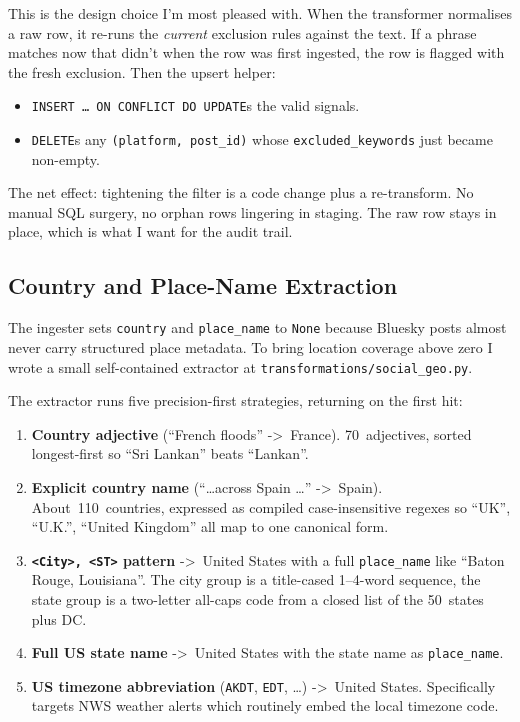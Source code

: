 \documentclass[11pt]{article}
\begin{document}
This is the design choice I'm most pleased with. When the transformer
normalises a raw row, it re-runs the \emph{current} exclusion rules
against the text. If a phrase matches now that didn't when the row was
first ingested, the row is flagged with the fresh exclusion. Then the
upsert helper:

\begin{itemize}[leftmargin=*]
  \item \texttt{INSERT \ldots\ ON CONFLICT DO UPDATE}s the valid signals.
  \item \texttt{DELETE}s any \texttt{(platform, post\_id)} whose
        \texttt{excluded\_keywords} just became non-empty.
\end{itemize}

The net effect: tightening the filter is a code change plus a
re-transform. No manual SQL surgery, no orphan rows lingering in
staging. The raw row stays in place, which is what I want for the
audit trail.

\subsection{Country and Place-Name Extraction}

The ingester sets \texttt{country} and \texttt{place\_name} to
\texttt{None} because Bluesky posts almost never carry structured place
metadata. To bring location coverage above zero I wrote a small
self-contained extractor at \texttt{transformations/social\_geo.py}.

The extractor runs five precision-first strategies, returning on the
first hit:

\begin{enumerate}[leftmargin=*]
  \item \textbf{Country adjective} (``French floods'' ->~France).
        70~adjectives, sorted longest-first so ``Sri Lankan'' beats
        ``Lankan''.
  \item \textbf{Explicit country name} (``\ldots across Spain
        \ldots'' ->~Spain). About~110~countries, expressed as compiled
        case-insensitive regexes so ``UK'', ``U.K.'', ``United Kingdom''
        all map to one canonical form.
  \item \textbf{\texttt{<City>, <ST>} pattern} ->~United States with a
        full \texttt{place\_name} like ``Baton Rouge, Louisiana''. The
        city group is a title-cased 1--4-word sequence, the state group
        is a two-letter all-caps code from a closed list of the
        50~states plus DC.
  \item \textbf{Full US state name} ->~United States with the state
        name as \texttt{place\_name}.
  \item \textbf{US timezone abbreviation} (\texttt{AKDT},
        \texttt{EDT}, \ldots) ->~United States. Specifically targets
        NWS weather alerts which routinely embed the local timezone
        code.
\end{enumerate}
\end{document}
